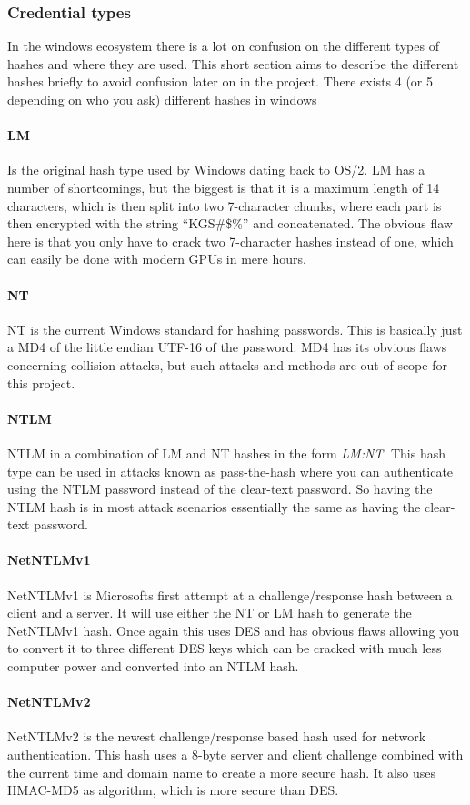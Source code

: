 \documentclass{article}
\begin{document}
\subsubsection{Credential types}
\label{sec:credential-types}
In the windows ecosystem there is a lot on confusion on the different types of hashes and where they are used. This short section aims to describe the different hashes briefly to avoid confusion later on in the project. There exists 4 (or 5 depending on who you ask) different hashes in windows\cite{url:hashes:hash-types}
\paragraph{LM}
Is the original hash type used by Windows dating back to OS/2. LM has a number of shortcomings, but the biggest is that it is a maximum length of 14 characters, which is then split into two 7-character chunks, where each part is then encrypted with the string ``KGS\!\@\#\$\%'' and concatenated. The obvious flaw here is that you only have to crack two 7-character hashes instead of one, which can easily be done with modern GPUs in mere hours.
\paragraph{NT}
NT is the current Windows standard for hashing passwords. This is basically just a MD4 of the little endian UTF-16 of the password. MD4 has its obvious flaws concerning collision attacks, but such attacks and methods are out of scope for this project.
\paragraph{NTLM}
NTLM in a combination of LM and NT hashes in the form \emph{LM:NT}. This hash type can be used in attacks known as pass-the-hash\cite{url:microsoft:pass-the-hash-mitigation} where you can authenticate using the NTLM password instead of the clear-text password. So having the NTLM hash is in most attack scenarios essentially the same as having the clear-text password.
\paragraph{NetNTLMv1}
NetNTLMv1 is Microsofts first attempt at a challenge/response hash between a client and a server. It will use either the NT or LM hash to generate the NetNTLMv1 hash. Once again this uses DES and has obvious flaws allowing you to convert it to three different DES keys which can be cracked with much less computer power and converted into an NTLM hash\cite{url:hashes:netntlmv1-to-ntlm}.
\paragraph{NetNTLMv2}
NetNTLMv2 is the newest challenge/response based hash used for network authentication. This hash uses a 8-byte server and client challenge combined with the current time and domain name to create a more secure hash. It also uses HMAC-MD5 as algorithm, which is more secure than DES.

\end{document}
